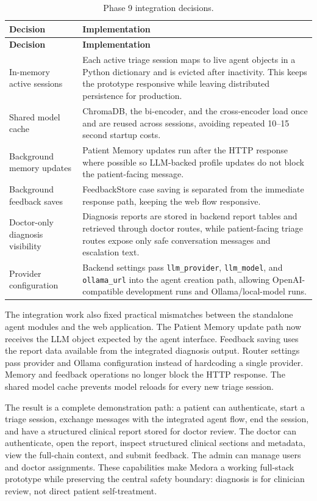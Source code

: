 \begin{longtable}{p{} p{}}
\caption{Phase 9 integration decisions.}
\label{tab:phase9_integration_decisions}\\
\toprule
\textbf{Decision} & \textbf{Implementation}\\
\midrule
\endfirsthead
\toprule
\textbf{Decision} & \textbf{Implementation}\\
\midrule
\endhead
In-memory active sessions & Each active triage session maps to live agent objects in a Python dictionary and is evicted after inactivity. This keeps the prototype responsive while leaving distributed persistence for production.\\
Shared model cache & ChromaDB, the bi-encoder, and the cross-encoder load once and are reused across sessions, avoiding repeated 10--15 second startup costs.\\
Background memory updates & Patient Memory updates run after the HTTP response where possible so LLM-backed profile updates do not block the patient-facing message.\\
Background feedback saves & FeedbackStore case saving is separated from the immediate response path, keeping the web flow responsive.\\
Doctor-only diagnosis visibility & Diagnosis reports are stored in backend report tables and retrieved through doctor routes, while patient-facing triage routes expose only safe conversation messages and escalation text.\\
Provider configuration & Backend settings pass \texttt{llm\_provider}, \texttt{llm\_model}, and \texttt{ollama\_url} into the agent creation path, allowing OpenAI-compatible development runs and Ollama/local-model runs.\\
\bottomrule
\end{longtable}

The integration work also fixed practical mismatches between the standalone agent modules and the web application. The Patient Memory update path now receives the LLM object expected by the agent interface. Feedback saving uses the report data available from the integrated diagnosis output. Router settings pass provider and Ollama configuration instead of hardcoding a single provider. Memory and feedback operations no longer block the HTTP response. The shared model cache prevents model reloads for every new triage session.

The result is a complete demonstration path: a patient can authenticate, start a triage session, exchange messages with the integrated agent flow, end the session, and have a structured clinical report stored for doctor review. The doctor can authenticate, open the report, inspect structured clinical sections and metadata, view the full-chain context, and submit feedback. The admin can manage users and doctor assignments. These capabilities make Medora a working full-stack prototype while preserving the central safety boundary: diagnosis is for clinician review, not direct patient self-treatment.

